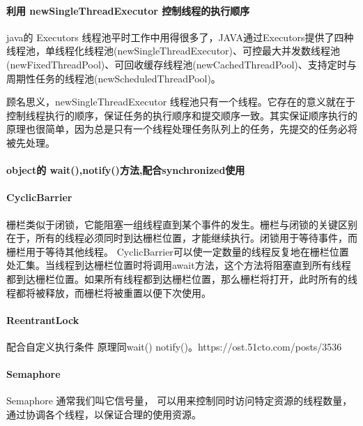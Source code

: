 \documentclass[../../../interview-questions.tex]{subfiles}
\begin{document}
\paragraph{利用 newSingleThreadExecutor 控制线程的执行顺序}

java的 Executors 线程池平时工作中用得很多了，JAVA通过Executors提供了四种线程池，单线程化线程池(newSingleThreadExecutor)、可控最大并发数线程池(newFixedThreadPool)、可回收缓存线程池(newCachedThreadPool)、支持定时与周期性任务的线程池(newScheduledThreadPool)。

顾名思义，newSingleThreadExecutor 线程池只有一个线程。它存在的意义就在于控制线程执行的顺序，保证任务的执行顺序和提交顺序一致。其实保证顺序执行的原理也很简单，因为总是只有一个线程处理任务队列上的任务，先提交的任务必将被先处理。

\paragraph{object的 wait(),notify()方法,配合synchronized使用}

\paragraph{CyclicBarrier}

栅栏类似于闭锁，它能阻塞一组线程直到某个事件的发生。栅栏与闭锁的关键区别在于，所有的线程必须同时到达栅栏位置，才能继续执行。闭锁用于等待事件，而栅栏用于等待其他线程。 CyclicBarrier可以使一定数量的线程反复地在栅栏位置处汇集。当线程到达栅栏位置时将调用await方法，这个方法将阻塞直到所有线程都到达栅栏位置。如果所有线程都到达栅栏位置，那么栅栏将打开，此时所有的线程都将被释放，而栅栏将被重置以便下次使用。

\paragraph{ReentrantLock}

配合自定义执行条件 原理同wait() notify()。https://ost.51cto.com/posts/3536

\paragraph{Semaphore}

Semaphore 通常我们叫它信号量， 可以用来控制同时访问特定资源的线程数量，通过协调各个线程，以保证合理的使用资源。
\end{document}
